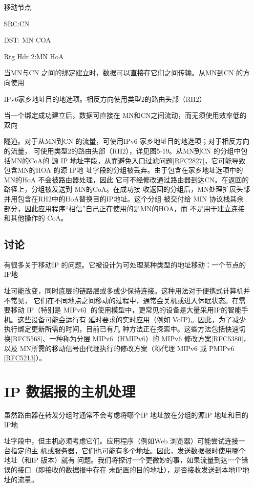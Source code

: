移动节点

SRC:CN

DST: MN COA

Rtg Hdr 2:MN HoA

当MN与CN 之间的绑定建立时，数据可以直接在它们之间传输。从MN到CN 的方向使用

IPv6家乡地址目的地选项。相反方向使用类型2的路由头部（RH2）

当一个绑定成功建立后，数据可直接在 MN和CN之间流动，而无须使用效率低的双向

隧道。对于从MN到CN 的流量，可使用IPv6 家乡地址目的地选项；对于相反方向的流量，
可使用类型2的路由头部（RH2），详见图5-19。从MN到CN 的分组中包括MN的CoA的
源 IP 地址字段，从而避免入口过滤问题\href{https://www.rfc-editor.org/rfc/rfc2827}{[RFC2827]}，它可能导致包含MN的HOA 的源 IP地
址字段的分组被丢弃。由于包含在家乡地址选项中的MN的HoA 不会被路由器处理，因此
它可不经修改通过路由器到达CN。在返回的路径上，分组被发送到 MN的CoA。在成功接
收返回的分组后，MN处理扩展头部并用包含在RH2中的HoA替换目的IP地址。这个分组
被交付给 MIN 协议栈其余部分，因此应用程序“相信”自己正在使用的是MN的HOA，而
不是用于建立连接和其他操作的 CoA。

\subsection{讨论}
有很多关于移动IP 的问题。它被设计为可处理某种类型的地址移动：一个节点的IP地

址可能改变，同时底层的链路层或多或少保持连接。这种用法对于便携式计算机并不常见，
它们在不同地点之间移动的过程中，通常会关机或进入休眠状态。在需要移动 IP（特别是
MIPv6）的使用模型中，更常见的设备是大量采用IP的智能手机。这些设备可能会运行有
延时要求的实时应用（例如 VoIP）。因此，为了减少执行绑定更新所需的时间，目前已有几
种方法正在探索中。这些方法包括快速切换\href{https://www.rfc-editor.org/rfc/rfc5568}{[RFC5568]}、一种称为分层 MIPv6（HMIPv6）的
MIPv6 修改方案\href{https://www.rfc-editor.org/rfc/rfc5380}{[RFC5380]}，以及 MN所需的移动信号由代理执行的修改方案（称代理
MIPv6 或 PMIPv6 \href{https://www.rfc-editor.org/rfc/rfc5213}{[RFC5213]}）。

\section{IP 数据报的主机处理}
虽然路由器在转发分组时通常不会考虑将哪个IP 地址放在分组的源IP 地址和目的IP地

址字段中，但主机必须考虑它们。应用程序（例如Web 浏览器）可能尝试连接一台指定的主
机或服务器，它们也可能有多个地址。因此，发送数据报时使用哪个地址（和IP 版本）就有
问题。我们将探讨一个更微妙的事，如果流量到达一个错误的接口（即接收的数据报中存在
未配置的目的地址），是否接收发送到本地IP地址的流量。

